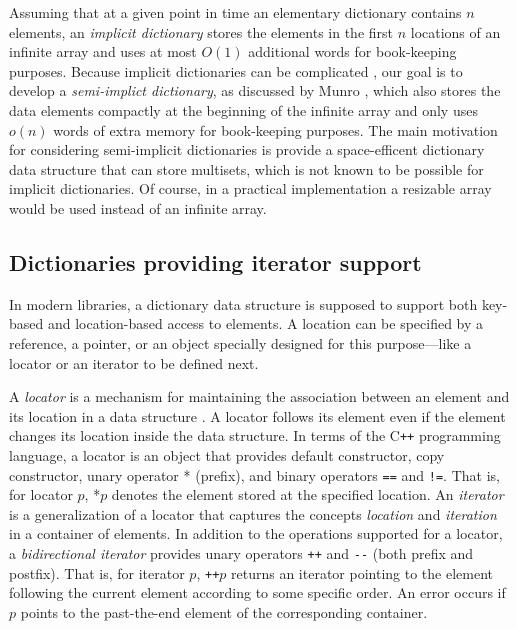 \documentclass{DIKU-article}
\begin{document}
Assuming that at a given point in time an elementary dictionary
contains $n$ elements, an \emph{implicit dictionary} stores the
elements in the first $n$ locations of an infinite array and uses at
most $O(1)$ additional words for book-keeping purposes.  Because
implicit dictionaries can be complicated \cite{FG03}, our goal is to
develop a \emph{semi-implict dictionary}, as discussed by Munro
\cite{Mun86}, which also stores the data elements compactly at the
beginning of the infinite array and only uses $o(n)$ words of extra
memory for book-keeping purposes.  The main motivation for considering
semi-implicit dictionaries is provide a space-efficent dictionary data
structure that can store multisets, which is not known to be possible
for implicit dictionaries. Of course, in a practical implementation a
resizable array would be used instead of an infinite array.

\subsection{Dictionaries providing iterator support}

In modern libraries, a dictionary data structure is supposed to
support both key-based and location-based access to elements. A
location can be specified by a reference, a pointer, or an object
specially designed for this purpose---like a locator or an iterator to
be defined next.

A \emph{locator} is a mechanism for maintaining the association
between an element and its location in a data structure \cite[Section
6.4]{GT98}. A locator follows its element even if the element changes
its location inside the data structure. In terms of the C\texttt{++}
programming language, a locator is an object that provides
default constructor, copy constructor, unary operator * (prefix), and
binary operators \texttt{==} and \texttt{!=}. That is, for
locator $p$, *$p$ denotes the element stored at the specified
location.  An \emph{iterator} is a generalization of a locator that
captures the concepts \textit{location} and \textit{iteration} in a
container of elements. In addition to the operations supported for a
locator, a \emph{bidirectional iterator} provides
unary operators \texttt{++} and \texttt{-}\texttt{-} (both prefix and
postfix). That is,
for iterator $p$, \texttt{++}$p$ returns an iterator pointing to the
element following the current element according to some
specific order. An error occurs if $p$ points to the past-the-end
element of the corresponding container.
\end{document}
